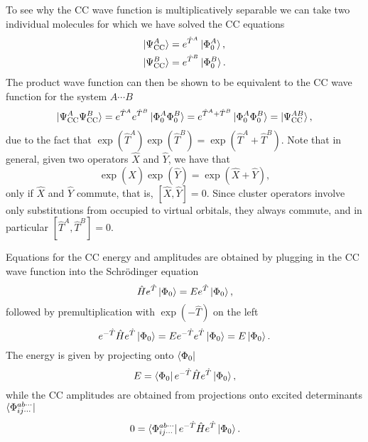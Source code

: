 \documentclass[../Main/chem532-notes.tex]{subfiles}
\begin{document}
To see why the CC wave function is multiplicatively separable we can take two individual molecules for which we have solved the CC equations
\begin{align}
\ket{\Psi_{\mathrm{CC}}^A} & = e^{\hat{T}^A} \ket{\Phi_0^A},\\
\ket{\Psi_{\mathrm{CC}}^B} & = e^{\hat{T}^B} \ket{\Phi_0^B}.
\end{align}
The product wave function can then be shown to be equivalent to the CC wave function for the system $A\cdots B$
\begin{align}
\ket{\Psi_{\mathrm{CC}}^A \Psi_{\mathrm{CC}}^B} = e^{\hat{T}^A} e^{\hat{T}^B}\ket{\Phi_0^A\Phi_0^B}
= e^{\hat{T}^A+\hat{T}^B}\ket{\Phi_0^A\Phi_0^B}
= \ket{\Psi_{\mathrm{CC}}^{AB}},
\end{align}
due to the fact that $\exp(\hat{T}^A)\exp(\hat{T}^B) = \exp(\hat{T}^A + \hat{T}^B)$.
Note that in general, given two operators $\hat{X}$ and $\hat{Y}$, we have that
\begin{equation}
\exp(\hat{X})\exp(\hat{Y}) = \exp(\hat{X} + \hat{Y}),
\end{equation}
only if $\hat{X}$ and $\hat{Y}$ commute, that is, $[\hat{X},\hat{Y}] = 0$.
Since cluster operators involve only substitutions from occupied to virtual orbitals, they always commute, and in particular $[\hat{T}^A,\hat{T}^B] = 0$.

Equations for the CC energy and amplitudes are obtained by plugging in the CC wave function into the Schr\"{o}dinger equation
\begin{equation}
\hat{H} e^{\hat{T}} \ket{\Phi_0} = E e^{\hat{T}} \ket{\Phi_0},
\end{equation}
followed by premultiplication with $\exp(-\hat{T})$ on the left
\begin{equation}
e^{-\hat{T} } \hat{H} e^{\hat{T} }\ket{\Phi_0} = E e^{-\hat{T} }e^{\hat{T}} \ket{\Phi_0} = E \ket{\Phi_0}.
\end{equation}
The energy is given by projecting onto $\bra{\Phi_0}$
\begin{equation}
E = \bra{\Phi_0} e^{-\hat{T} } \hat{H} e^{\hat{T} }\ket{\Phi_0},
\end{equation}
while the CC amplitudes are obtained from projections onto excited determinants $\bra{\Phi_{ij\cdots}^{ab\cdots}}$
\begin{equation}
0 = \bra{\Phi_{ij\cdots}^{ab\cdots}} e^{-\hat{T} } \hat{H} e^{\hat{T} }\ket{\Phi_0}.
\end{equation}
\end{document}
